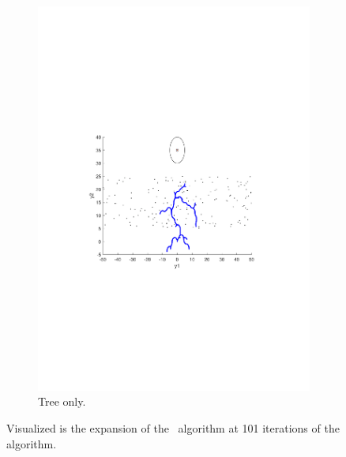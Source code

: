\begin{figure}[!t]
\begin{subfigure}[b]{\columnwidth}
    \includegraphics[scale=.6, trim={4.5cm, 9cm, 5cm, 7cm}, clip]{figures/experiments/rrtfunnel-101samples-dyn.pdf}
  \caption{Tree only.}
  \end{subfigure}
  \caption[The expansion of the \rrtfunnel algorithm at 1, and 101 iterations]{Visualized is the expansion of the \rrtfunnel~algorithm at 101 iterations of the algorithm.}
\end{figure}


